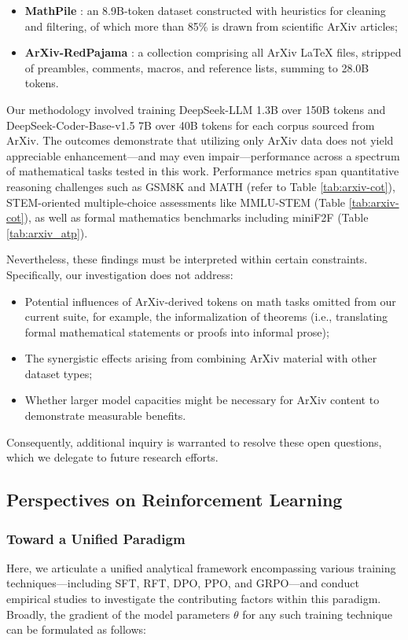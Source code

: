 \begin{itemize}[topsep=0pt]
    \item \textbf{MathPile} \citep{mathpile}: an 8.9B-token dataset constructed with heuristics for cleaning and filtering, of which more than 85\% is drawn from scientific ArXiv articles;
    \item \textbf{ArXiv-RedPajama} \citep{redpajama}: a collection comprising all ArXiv LaTeX files, stripped of preambles, comments, macros, and reference lists, summing to 28.0B tokens.
\end{itemize}

Our methodology involved training DeepSeek-LLM 1.3B over 150B tokens and DeepSeek-Coder-Base-v1.5 7B over 40B tokens for each corpus sourced from ArXiv. The outcomes demonstrate that utilizing only ArXiv data does not yield appreciable enhancement—and may even impair—performance across a spectrum of mathematical tasks tested in this work. Performance metrics span quantitative reasoning challenges such as GSM8K and MATH (refer to Table \ref{tab:arxiv-cot}), STEM-oriented multiple-choice assessments like MMLU-STEM (Table \ref{tab:arxiv-cot}), as well as formal mathematics benchmarks including miniF2F (Table \ref{tab:arxiv_atp}).

Nevertheless, these findings must be interpreted within certain constraints. Specifically, our investigation does not address:

\begin{itemize}[topsep=0pt]
    \item Potential influences of ArXiv-derived tokens on math tasks omitted from our current suite, for example, the informalization of theorems (i.e., translating formal mathematical statements or proofs into informal prose);
    \item The synergistic effects arising from combining ArXiv material with other dataset types;
    \item Whether larger model capacities might be necessary for ArXiv content to demonstrate measurable benefits.
\end{itemize}

Consequently, additional inquiry is warranted to resolve these open questions, which we delegate to future research efforts.

\subsection{Perspectives on Reinforcement Learning}
\subsubsection{Toward a Unified Paradigm} Here, we articulate a unified analytical framework encompassing various training techniques—including SFT, RFT, DPO, PPO, and GRPO—and conduct empirical studies to investigate the contributing factors within this paradigm. Broadly, the gradient of the model parameters $\theta$ for any such training technique can be formulated as follows:

